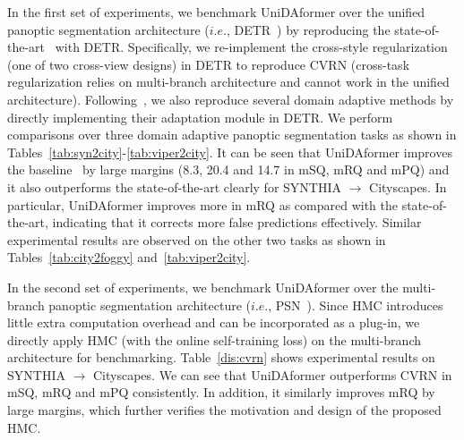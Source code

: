 \documentclass[10pt,twocolumn,letterpaper]{article}
\begin{document}
In the first set of experiments, we benchmark UniDAformer over the unified panoptic segmentation architecture ($i.e.$, DETR~\cite{carion2020detr}) by reproducing the state-of-the-art~\cite{huang2021cvrn} with DETR. Specifically, we re-implement the cross-style regularization (one of two cross-view designs) in DETR to reproduce CVRN (cross-task regularization relies on multi-branch architecture and cannot work in the unified architecture). Following~\cite{huang2021cvrn}, we also reproduce several domain adaptive methods by directly implementing their adaptation module in DETR. We perform comparisons over three domain adaptive panoptic segmentation tasks as shown in Tables~\ref{tab:syn2city}-\ref{tab:viper2city}. It can be seen that UniDAformer improves the baseline~\cite{carion2020detr} by large margins (8.3, 20.4 and 14.7 in mSQ, mRQ and mPQ) and it also outperforms the state-of-the-art clearly for SYNTHIA $\rightarrow$ Cityscapes. In particular, UniDAformer improves more in mRQ as compared with the state-of-the-art, indicating that it corrects more false predictions effectively. Similar experimental results are observed on the other two tasks as shown in Tables~\ref{tab:city2foggy} and~\ref{tab:viper2city}.

In the second set of experiments, we benchmark UniDAformer over the multi-branch panoptic segmentation architecture ($i.e.$, PSN~\cite{kirillov2019panoptic}). Since HMC introduces little extra computation overhead and can be incorporated as a plug-in, we directly apply HMC (with the online self-training loss) on the multi-branch architecture for benchmarking. Table~\ref{dis:cvrn} shows experimental results on SYNTHIA $\rightarrow$ Cityscapes. We can see that UniDAformer outperforms CVRN in mSQ, mRQ and mPQ consistently. In addition, it similarly improves mRQ by large margins, which further verifies the motivation and design of the proposed HMC.


\renewcommand\arraystretch{1.}
\begin{table}[t]
\centering
\begin{footnotesize}
\end{footnotesize}
\caption{
The calibration order affects domain adaptation performance. The experiments are conducted over task SYNTHIA $\rightarrow$ Cityscapes. R, S and P denote region-wise calibration, superpixel-wise calibration and pixel-wise calibration, respectively.
}
\label{dis:order}
\end{table}
\end{document}
